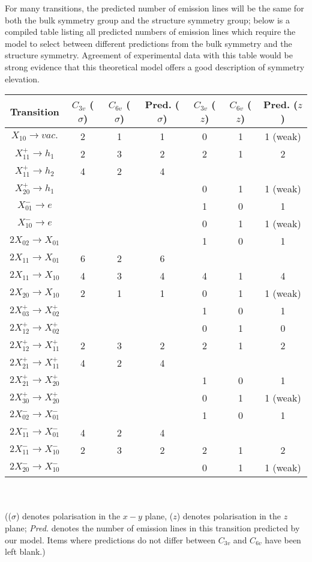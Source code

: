 \documentclass[12pt]{article}
\begin{document}
	For many transitions, the predicted number of emission lines will be the same for both the bulk symmetry group and the structure symmetry group; below is a compiled table listing all predicted numbers of emission lines which require the model to select between different predictions from the bulk symmetry and the structure symmetry. Agreement of experimental data with this table would be strong evidence that this theoretical model offers a good description of symmetry elevation.
	
	\begin{center}
	\begin{tabular}{ c|c c c|c c c }
	Transition & $C_{3v}$ ($\sigma$) & $C_{6v}$ ($\sigma$) & Pred. ($\sigma$) & $C_{3v}$ ($z$) & $C_{6v}$ ($z$) & Pred. ($z$)\\
	\hline
	$X_{10}\to vac.$ & 2 & 1 & 1 & 0 & 1 & 1 (weak)\\
	$X^+_{11}\to h_1$ & 2 & 3 & 2 & 2 & 1 & 2\\
	$X^+_{11}\to h_2$ & 4 & 2 & 4 & & &\\
	$X^+_{20}\to h_1$ & & & & 0 & 1 & 1 (weak)\\
	$X^-_{01}\to e$ & & & & 1 & 0 & 1\\
	$X^-_{10}\to e$ & & & & 0 & 1 & 1 (weak)\\
	$2X_{02}\to X_{01}$ & & & & 1 & 0 & 1\\
	$2X_{11}\to X_{01}$ & 6 & 2 & 6 & & &\\
	$2X_{11}\to X_{10}$ & 4 & 3 & 4 & 4 & 1 & 4\\
	$2X_{20}\to X_{10}$ & 2 & 1 & 1 & 0 & 1 & 1 (weak)\\
	$2X^+_{03}\to X^+_{02}$ & & & & 1 & 0 & 1\\
	$2X^+_{12}\to X^+_{02}$ & & & & 0 & 1 & 0\\
	$2X^+_{12}\to X^+_{11}$ & 2 & 3 & 2 & 2 & 1 & 2\\
	$2X^+_{21}\to X^+_{11}$ & 4 & 2 & 4 & & &\\
	$2X^+_{21}\to X^+_{20}$ & & & & 1 & 0 & 1\\
	$2X^+_{30}\to X^+_{20}$ & & & & 0 & 1 & 1 (weak)\\
	$2X^-_{02}\to X^-_{01}$ & & & & 1 & 0 & 1\\
	$2X^-_{11}\to X^-_{01}$ & 4 & 2 & 4 & & &\\
	$2X^-_{11}\to X^-_{10}$ & 2 & 3 & 2 & 2 & 1 & 2\\
	$2X^-_{20}\to X^-_{10}$ & & & & 0 & 1 & 1 (weak)
	\end{tabular}\\\hfill\\
	(($\sigma$) denotes polarisation in the $x-y$ plane, ($z$) denotes polarisation in the $z$ plane; \textit{Pred.} denotes the number of emission lines in this transition predicted by our model. Items where predictions do not differ between $C_{3v}$ and $C_{6v}$ have been left blank.)
	\end{center}
	
\end{document}
